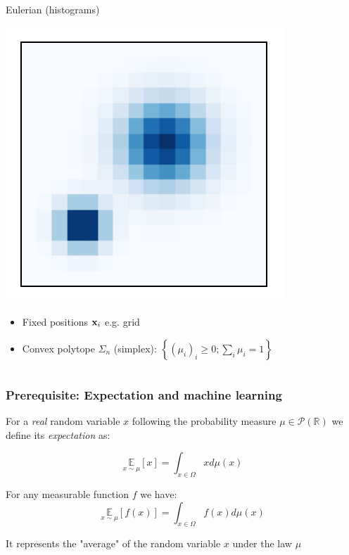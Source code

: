 \documentclass[french,9pt]{beamer}
\newcommand{\x}{{\bf x}}
\begin{document}
\begin{frame}
\begin{columns}[t]
\begin{column}{.45\linewidth}
\begin{block}{Eulerian (histograms)}
\begin{center}
\includegraphics[width=.7\linewidth]{fig/distrib_hist.pdf}
\end{center}\vspace{-5mm}
\begin{itemize}
\item Fixed positions $\x_i$ e.g. grid
\item Convex polytope $\Sigma_n$ (simplex):
$\left\{(\mu_i)_i\geq 0; \sum_i \mu_i=1\right\}$
\end{itemize}
\end{block}
\end{column}
\end{columns}
\end{frame}


\begin{frame}
\frametitle{Prerequisite: Expectation and machine learning}
For a \emph{real} random variable $x$ following the probability measure $\mu \in \mathcal{P}(\mathbb{R})$  we define its \emph{expectation} as:

\begin{equation}
    \underset{x \sim \mu}{\mathbb{E}}[x]=\int_{x \in \Omega} x d\mu(x)
\end{equation}{}

\pause

For any measurable function $f$ we have: $$\underset{x \sim \mu}{\mathbb{E}}[f(x)]=\int_{x \in \Omega} f(x) d\mu(x)$$

It represents the "average" of the random variable $x$ under the law $\mu$

\end{frame}
\end{document}
